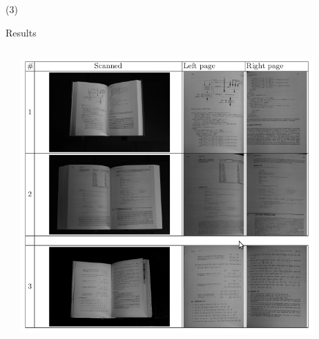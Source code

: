 \begin{frame}{  (3)}
\begin{block}{Results}
\begin{columns}
\begin{column}{0.5\textwidth}
\end{column}
\begin{column}{0.5\textwidth}  
    \begin{center}
     \includegraphics[width=0.88\textwidth]{Figs/BookScanner4}
     \end{center}
\end{column}
\end{columns}
\end{block} 
\end{frame}

